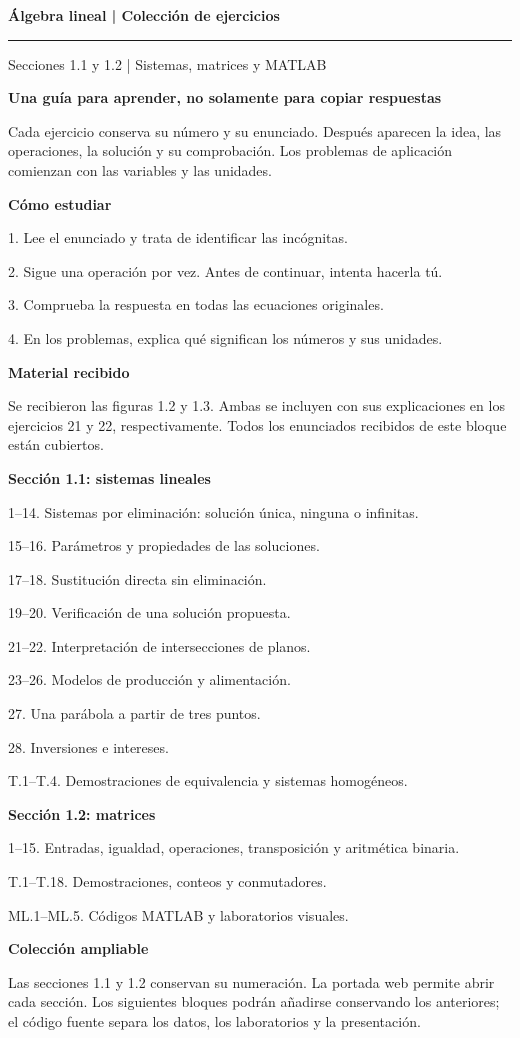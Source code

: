 \documentclass[11pt,a4paper,landscape]{article}
\newcommand{\titulo}[1]{{\LARGE\bfseries #1}\par\smallskip\hrule\medskip}
\begin{document}
\titulo{Álgebra lineal | Colección de ejercicios}
{\Large Secciones 1.1 y 1.2 | Sistemas, matrices y MATLAB}\par\bigskip
\begin{minipage}[t]{.48\textwidth}
\textbf{Una guía para aprender, no solamente para copiar respuestas}\par
Cada ejercicio conserva su número y su enunciado. Después aparecen la idea, las operaciones, la solución y su comprobación. Los problemas de aplicación comienzan con las variables y las unidades.\par
\textbf{Cómo estudiar}\par
1. Lee el enunciado y trata de identificar las incógnitas.\par
2. Sigue una operación por vez. Antes de continuar, intenta hacerla tú.\par
3. Comprueba la respuesta en todas las ecuaciones originales.\par
4. En los problemas, explica qué significan los números y sus unidades.\par
\textbf{Material recibido}\par
Se recibieron las figuras 1.2 y 1.3. Ambas se incluyen con sus explicaciones en los ejercicios 21 y 22, respectivamente. Todos los enunciados recibidos de este bloque están cubiertos.
\end{minipage}\hfill
\begin{minipage}[t]{.48\textwidth}
\textbf{Sección 1.1: sistemas lineales}\par
1--14. Sistemas por eliminación: solución única, ninguna o infinitas.\par
15--16. Parámetros y propiedades de las soluciones.\par
17--18. Sustitución directa sin eliminación.\par
19--20. Verificación de una solución propuesta.\par
21--22. Interpretación de intersecciones de planos.\par
23--26. Modelos de producción y alimentación.\par
27. Una parábola a partir de tres puntos.\par
28. Inversiones e intereses.\par
T.1--T.4. Demostraciones de equivalencia y sistemas homogéneos.\par\medskip\textbf{Sección 1.2: matrices}\par 1--15. Entradas, igualdad, operaciones, transposición y aritmética binaria.\par T.1--T.18. Demostraciones, conteos y conmutadores.\par ML.1--ML.5. Códigos MATLAB y laboratorios visuales.\par\medskip
\textbf{Colección ampliable}\par
Las secciones 1.1 y 1.2 conservan su numeración. La portada web permite abrir cada sección. Los siguientes bloques podrán añadirse conservando los anteriores; el código fuente separa los datos, los laboratorios y la presentación.
\end{minipage}
\end{document}
